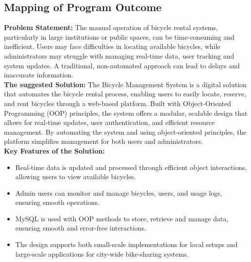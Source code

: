 \subsection{Mapping of Program Outcome} 
\textbf{Problem Statement:}
The manual operation of bicycle rental systems, particularly in large institutions or public spaces, can be time-consuming and inefficient. Users may face difficulties in locating available bicycles, while administrators may struggle with managing real-time data, user tracking and system updates. A traditional, non-automated approach can lead to delays and inaccurate information.\\
\textbf{The suggested Solution:}
The Bicycle Management System is a digital solution that automates the bicycle rental process, enabling users to easily locate, reserve, and rent bicycles through a web-based platform. Built with Object-Oriented Programming (OOP) principles, the system offers a modular, scalable design that allows for real-time updates, user authentication, and efficient resource management. By automating the system and using object-oriented principles, the platform simplifies management for both users and administrators.\\
\textbf{Key Features of the Solution:}
\begin{itemize}
\item Real-time data is updated and processed through efficient object interactions, allowing users to view available bicycles.
\item Admin users can monitor and manage bicycles, users, and usage logs, ensuring smooth operations.
\item MySQL is used with OOP methods to store, retrieve and manage data, ensuring smooth and error-free interactions.
\item The design supports both small-scale implementations for local setups and large-scale applications for city-wide bike-sharing systems.\cite{4.3.1}
\end{itemize}

